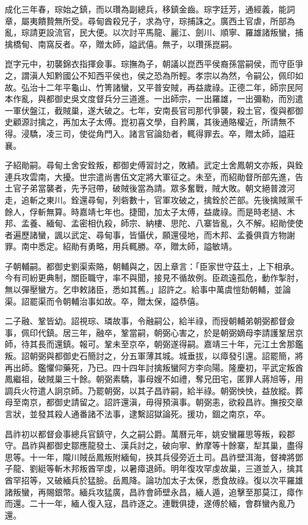 \begin{pinyinscope}
成化三年春，琮始之鎮，而以瓚為副總兵，移鎮金齒。琮字廷芳，通經義，能詞章，屬夷饋贄無所受。尋甸酋殺兄子，求為守，琮捕誅之。廣西土官虐，所部為亂，琮請更設流官，民大便。以次討平馬龍、麗江、劍川、順寧、羅雄諸叛蠻，捕擒橋甸、南窩反者。卒，贈太師，謚武僖。無子，以瓚孫崑嗣。

崑字元中，初襲錦衣指揮僉事。琮撫為子，朝議以崑西平侯裔孫當嗣侯，而守臣爭之，謂滇人知黔國公不知西平侯也，侯之恐為所輕。孝宗以為然，令嗣公，佩印如故。弘治十二年平龜山、竹箐諸蠻，又平普安賊，再益歲祿。正德二年，師宗民阿本作亂，與都御史吳文度督兵分三道進。一出師宗，一出羅雄，一出彌勒，而別遣一軍伏盤江，截賊巢，遂大破之。七年，安南長官司那代爭襲，殺土官，復與都御史顧源討擒之，再加太子太傅。崑初喜文學，自矜厲，其後通賂權近，所請無不得。浸驕，凌三司，使從角門入。諸言官論劾者，輒得罪去。卒，贈太師，謚莊襄。

子紹勛嗣。尋甸土舍安銓叛，都御史傅習討之，敗績。武定土舍鳳朝文亦叛，與銓連兵攻雲南，大擾。世宗遣尚書伍文定將大軍征之。未至，而紹勛督所部先進，告土官子弟當襲者，先予冠帶，破賊後當為請。眾多奮戰，賊大敗。朝文絕普渡河走，追斬之東川。銓還尋甸，列砦數十，官軍攻破之，擒銓於芒部。先後擒賊黨千餘人，俘斬無算。時嘉靖七年也。捷聞，加太子太傅，益歲祿。而是時老撾、木邦、孟養、緬甸、孟密相仇殺，師宗、納樓、思陀、八寨皆亂，久不解。紹勛使使者遍歷諸蠻，諷以武定、尋甸事，皆懾伏，願還侵地，而木邦、孟養俱貢方物謝罪。南中悉定。紹勛有勇略，用兵輒勝。卒，贈太師，謚敏靖。

子朝輔嗣。都御史劉渠索賂，朝輔與之，因上章言：「臣家世守茲土，上下相承。今有司紛更典制，關臣職守，率不與聞，接見不循故例。臣疏遠孤危，動作掣肘，無以彈壓蠻方。乞申敕諸臣，悉如其舊。」詔許之。給事中萬虞愷劾朝輔，並論渠。詔罷渠而令朝輔治事如故。卒，贈太保，謚恭僖。

二子融、鞏皆幼。詔視琮、璘故事，令融嗣公，給半祿，而授朝輔弟朝弼都督僉事，佩印代鎮。居三年，融卒，鞏當嗣，朝弼心害之，於是朝弼嫡母李請護鞏居京師，待其長而還鎮。報可。鞏未至京卒，朝弼遂得嗣。嘉靖三十年，元江土舍那鑑叛。詔朝弼與都御史石簡討之，分五軍薄其城。城垂拔，以瘴發引還。詔罷簡，將再出師。鑑懼仰藥死，乃已。四十四年討擒叛蠻阿方李向陽。隆慶初，平武定叛酋鳳繼祖，破賊巢三十餘。朝弼素驕，事母嫂不如禮，奪兄田宅，匿罪人蔣旭等，用調兵火符遣人詗京師。乃罷朝弼，以其子昌祚嗣，給半祿。朝弼怏怏，益放縱。葬母至南京，都御史請留之。詔許還滇，毋得預滇事。朝弼恚，欲殺昌祚。撫按交章言狀，並發其殺人通番諸不法事，逮繫詔獄論死。援功，錮之南京，卒。

昌祚初以都督僉事總兵官鎮守，久之嗣公爵。萬曆元年，姚安蠻羅思等叛，殺郡守。昌祚與都御史鄒應龍發土、漢兵討之，破向寧、鮓摩等十餘寨，犁其巢，盡得思等。十一年，隴川賊岳鳳叛附緬甸，挾其兵侵旁近土司。昌祚壁洱海，督裨將鄧子龍、劉綎等斬木邦叛酋罕虔，以暑瘴退師。明年復攻罕虔故巢，三道並入，擒其酋罕招等，又破緬兵於猛臉。岳鳳降。論功加太子太保，悉食故祿。復以次平羅雄諸叛蠻，再賜銀幣。緬兵攻猛廣，昌祚會師壁永昌，緬人遁，追擊至那莫江，瘴作而還。二十一年，緬人復入寇，昌祚逐之。連戰俱捷，遂傅於緬，會群蠻內亂乃還。


\end{pinyinscope}
